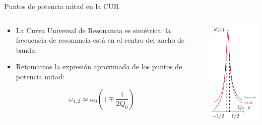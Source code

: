 \documentclass[xcolor={usenames,svgnames,dvipsnames}]{beamer}
\begin{document}
\begin{frame}[label={sec:orgb149261}]{Puntos de potencia mitad en la CUR}
\begin{columns}
\begin{column}{0.7\columnwidth}
\begin{itemize}
\item La Curva Universal de Resonancia es simétrica: la frecuencia de resonancia está en el centro del ancho de banda.
\item Retomamos la expresión aproximada de los puntos de potencia mitad:
\end{itemize}
\[
  \omega_{1,2} \simeq \omega_0 (1 \mp \frac{1}{2Q_0})
\]
\end{column}

\begin{column}{0.3\columnwidth}
\begin{center}
\includegraphics[width=.9\linewidth]{../figs/CUR.pdf}
\end{center}
\end{column}
\end{columns}


\end{frame}
\end{document}
